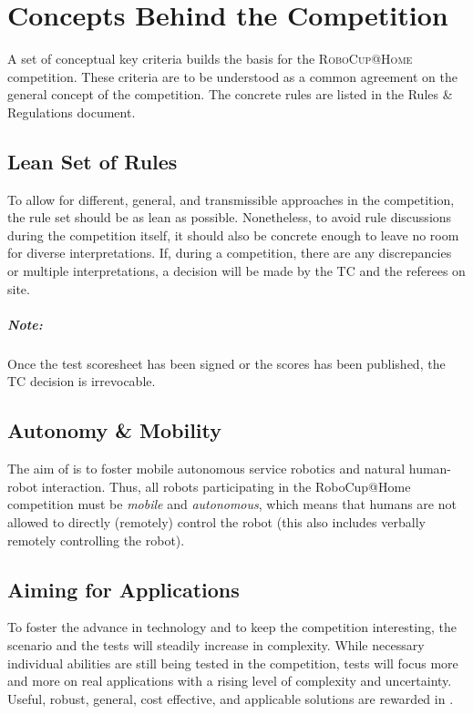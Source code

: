 \chapter{Concepts Behind the Competition}
\label{chap:concepts}

A set of conceptual key criteria builds the basis for the \textsc{RoboCup@Home} competition.
These criteria are to be understood as a common agreement on the general concept of the competition.
The concrete rules are listed in the \AtHome{} Rules \& Regulations document.

\section{Lean Set of Rules}
\label{concept:lean_set_of_rules}

To allow for different, general, and transmissible approaches in the \AtHome{} competition, the rule set should be as lean as possible.
Nonetheless, to avoid rule discussions during the competition itself, it should also be concrete enough to leave no room for diverse interpretations.
If, during a competition, there are any discrepancies or multiple interpretations, a decision will be made by the TC and the referees on site.

\paragraph*{Note:} Once the test scoresheet has been signed or the scores has been published, the TC decision is irrevocable.

\section{Autonomy \& Mobility}
\label{concept:autonomy_and_mobility}

The aim of \AtHome{} is to foster mobile autonomous service robotics and natural human-robot interaction.
Thus, all robots participating in the RoboCup@Home competition must be \emph{mobile} and \emph{autonomous}, which means that humans are not allowed to directly (remotely) control the robot (this also includes verbally remotely controlling the robot).

\section{Aiming for Applications}
\label{concept:aiming_for_applications}

To foster the advance in technology and to keep the competition interesting, the scenario and the tests will steadily increase in complexity.
While necessary individual abilities are still being tested in the competition, tests will focus more and more on real applications with a rising level of complexity and uncertainty.
Useful, robust, general, cost effective, and applicable solutions are rewarded in \AtHome.

